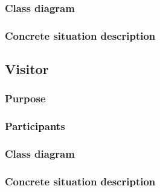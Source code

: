 \documentclass[a4paper,10pt]{article}
\begin{document}
\subsubsection{Class diagram}

\subsubsection{Concrete situation description}


\subsection{Visitor}

\subsubsection{Purpose}

\subsubsection{Participants}

\subsubsection{Class diagram}

\subsubsection{Concrete situation description}
\end{document}
